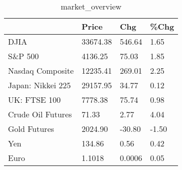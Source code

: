 \documentclass{article}%
\begin{document}
%


\begin{table}[htbp]%
\caption{market\_overview}%
\centering%
\begin{adjustbox}{width=1\textwidth}%
\begin{tabular}{llll}
\toprule
                  &    Price &    Chg &  \%Chg \\
\midrule
             DJIA & 33674.38 & 546.64 &  1.65 \\
          S\&P 500 &  4136.25 &  75.03 &  1.85 \\
 Nasdaq Composite & 12235.41 & 269.01 &  2.25 \\
Japan: Nikkei 225 & 29157.95 &  34.77 &  0.12 \\
     UK: FTSE 100 &  7778.38 &  75.74 &  0.98 \\
Crude Oil Futures &    71.33 &   2.77 &  4.04 \\
     Gold Futures &  2024.90 & -30.80 & -1.50 \\
              Yen &   134.86 &   0.56 &  0.42 \\
             Euro &   1.1018 & 0.0006 &  0.05 \\
\bottomrule
\end{tabular}
%
\end{adjustbox}%
\end{table}

%
\end{document}

